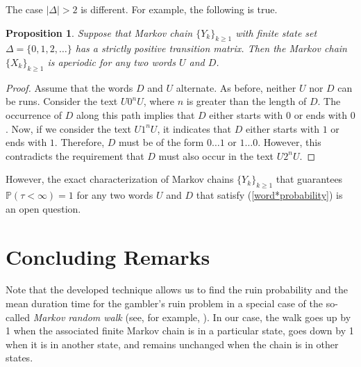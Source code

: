 \documentclass{amsart}
\newtheorem{Proposition}{Proposition}
\newcommand{\PP}{{\mathbb{P}}}
\newcommand{\1}{{\mathbf{1}}}
\begin{document}
The case $|\Delta|>2$ is different. For example, the following is true.
\begin{Proposition}
Suppose that Markov chain $\{Y_k\}_{k\geq 1}$ with finite state set $\Delta=\{0,1,2,\dots\}$
has a strictly positive transition matrix. Then the Markov chain $\{X_k\}_{k\geq 1}$ is
aperiodic  for any two words $U$ and $D$.
\end{Proposition}
\begin{proof}
Assume that the words $D$ and $U$ alternate. As before, neither $U$ nor $D$ can be runs.
Consider the text $U0^nU$, where $n$ is greater than the length of $D$. The occurrence
of $D$ along this path implies that $D$ either starts with $0$ or ends with $0$. Now, if
we consider the text $U1^nU$, it indicates that $D$ either starts with $1$ or
ends with $1$. Therefore, $D$ must be of the form $0\dots 1$ or $1\dots 0$.
However, this contradicts the requirement that $D$ must also occur in the text $U2^nU$.
\end{proof}
However, the exact characterization of  Markov chains $\{Y_k\}_{k\geq 1}$ that guarantees
$\PP(\tau<\infty)=1$ for any two words $U$ and $D$ that satisfy (\ref{word*probability})
is an open question.

\section{Concluding Remarks}

Note that the developed technique allows us to find the ruin probability and the mean duration time
for the gambler’s ruin problem in a special case of the so-called {\it Markov random walk}
(see, for example, \cite{Grama_etal2018}). In our case, the walk goes up by 1 when
the associated finite Markov chain is in a particular state, goes down by 1 when it is in another
state, and remains unchanged when the chain is in other states.



\end{document}
